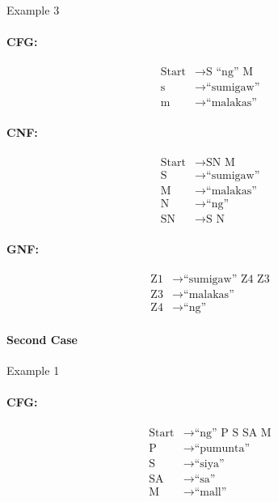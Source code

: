 Example 3
\paragraph{CFG:}
\begin{equation*}
    \begin{aligned}
        \text{Start}   & \rightarrow \text{S “ng” M}   \\
        \text{s} & \rightarrow \text{“sumigaw”} \\
        \text{m} & \rightarrow \text{“malakas”}
    \end{aligned}
\end{equation*}

\paragraph{CNF:}
\begin{equation*}
    \begin{aligned}
        \text{Start}   & \rightarrow \text{SN M}   \\
        \text{S} & \rightarrow \text{“sumigaw”} \\
        \text{M} & \rightarrow \text{“malakas”} \\
        \text{N} & \rightarrow \text{“ng”} \\
        \text{SN} & \rightarrow \text{S N}
    \end{aligned}
\end{equation*}

\paragraph{GNF:}
\begin{equation*}
    \begin{aligned}
        \text{Z1}   & \rightarrow \text{“sumigaw” Z4 Z3}   \\
        \text{Z3} & \rightarrow \text{“malakas”} \\
        \text{Z4} & \rightarrow \text{“ng”}
    \end{aligned}
\end{equation*}


\paragraph{Second Case}
Example 1
\paragraph{CFG:}
\begin{equation*}
    \begin{aligned}
        \text{Start}   & \rightarrow \text{“ng” P S SA M}   \\
        \text{P} & \rightarrow \text{“pumunta”} \\
        \text{S} & \rightarrow \text{“siya”} \\
        \text{SA} & \rightarrow \text{“sa”} \\
        \text{M} & \rightarrow \text{“mall”}
    \end{aligned}
\end{equation*}

